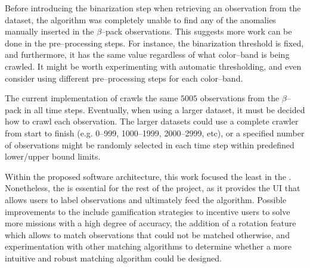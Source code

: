 Before introducing the binarization step when retrieving an observation from the dataset, the \mlblink algorithm was completely unable to find any of the anomalies manually inserted in the $\beta$--pack observations. This suggests more work can be done in the pre--processing steps. For instance, the binarization threshold is fixed, and furthermore, it has the same value regardless of what \panstarrs color--band is being crawled. It might be worth experimenting with automatic thresholding, and even consider using different pre--processing steps for each color--band. \newline

The current implementation of \mlblink crawls the same $5005$ observations from the $\beta$--pack in all time steps. Eventually, when using a larger dataset, it must be decided how to crawl each observation. The larger datasets could use a complete crawler from start to finish (e.g. 0--999, 1000--1999, 2000--2999, etc), or a specified number of observations might be randomly selected in each time step within predefined lower/upper bound limits. \newline

Within the proposed \vasco software architecture, this work focused the least in the \mlblinkui. Nonetheless, the \mlblinkui is essential for the rest of the project, as it provides the UI that allows users to label observations and ultimately feed the \mlblink algorithm. Possible improvements to the \mlblinkui include gamification strategies to incentive users to solve more missions with a high degree of accuracy, the addition of a rotation feature which allows to match observations that could not be matched otherwise, and experimentation with other matching algorithms to determine whether a more intuitive and robust matching algorithm could be designed. \newline

